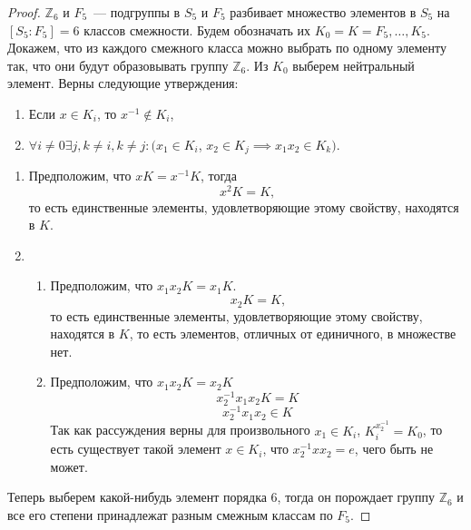 \documentclass[utf8,a4paper,draft]{article}
\begin{document}
\begin{proof}
$\mathbb{Z}_6$ и $F_5$~--- подгруппы в $S_5$ и $F_5$ разбивает множество элементов в $S_5$ на $[S_5:F_5]=6$ классов смежности. Будем обозначать их $K_0=K=F_5,\ldots,K_5$. Докажем, что из каждого смежного класса можно выбрать по одному элементу так, что они будут образовывать группу $\mathbb{Z}_6$. Из $K_0$ выберем нейтральный элемент. Верны следующие утверждения:
\begin{enumerate}
\item Если $x\in K_i$, то $x^{-1}\not\in K_i$,
\item $\forall i\not=0\exists j, k\not=i,k\not=j: (x_1\in K_i$, $x_2\in K_j\implies x_1x_2\in K_k)$.
\hspace{0.5cm}\\
\end{enumerate}

\begin{enumerate}
\item Предположим, что $xK=x^{-1}K$, тогда $$x^2K=K\text{,}$$ то есть единственные элементы, удовлетворяющие этому свойству, находятся в $K$.
\item
\begin{enumerate}
\item Предположим, что $x_1x_2K=x_1K$.
$$x_2K=K\text{,}$$
то есть единственные элементы, удовлетворяющие этому свойству, находятся в $K$, то есть элементов, отличных от единичного, в множестве нет.
\item Предположим, что $x_1x_2K=x_2K$
$$x_2^{-1}x_1x_2K=K$$
$$x_2^{-1}x_1x_2\in K$$
Так как рассуждения верны для произвольного $x_1\in K_i$, $K_i^{x_2^{-1}}=K_0$, то есть существует такой элемент $x\in K_i$, что $x_2^{-1}xx_2=e$, чего быть не может.
\end{enumerate}
\end{enumerate}
Теперь выберем какой-нибудь элемент порядка 6, тогда он порождает группу $\mathbb{Z}_6$ и все его степени принадлежат разным смежным классам по $F_5$.
\end{proof}
\end{document}

